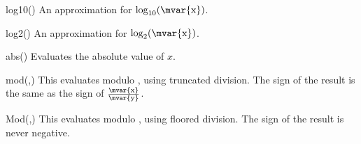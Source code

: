 \begin{math-function}{log10()}
    An approximation for $\log_{10}(\textrm{\mvar{x}})$.
\begin{codeexample}[]
 \pgfmathresult
\end{codeexample}
\end{math-function}

\begin{math-function}{log2()}
    An approximation for $\log_2(\textrm{\mvar{x}})$.
\begin{codeexample}[]
 \pgfmathresult
\end{codeexample}
\end{math-function}

\begin{math-function}{abs()}
\mathcommand
    Evaluates the absolute value of $x$.
\begin{codeexample}[]
 \pgfmathresult
\end{codeexample}

\begin{codeexample}[]
 \pgfmathresult
\end{codeexample}
\end{math-function}

\begin{math-function}{mod(,)}
\mathcommand
    This evaluates  modulo , using truncated division. The sign
    of the result is the same as the sign of
    $\frac{\textrm{\mvar{x}}}{\textrm{\mvar{y}}}$.
\begin{codeexample}[]
 \pgfmathresult
\end{codeexample}

\begin{codeexample}[]
 \pgfmathresult
\end{codeexample}
\end{math-function}

\begin{math-function}{Mod(,)}
\mathcommand
    This evaluates  modulo , using floored division. The sign
    of the result is never negative.
\begin{codeexample}[]
 \pgfmathresult
\end{codeexample}
\end{math-function}

